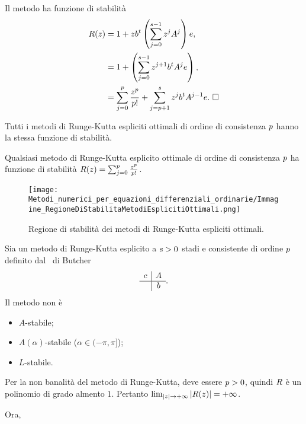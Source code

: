 \par Il metodo ha funzione di stabilit\`a
\begin{align*}
	R(z) &= 1 + z {b}^t \left ( \sum_{j = 0}^{s - 1} z^jA^j \right ) e,\\
	&= 1 + \left ( \sum_{j = 0}^{s - 1} z^{j + 1} {b}^t A^j e \right ),\\
	&= \sum_{j = 0}^p \frac{z^p}{p !} + \sum_{j = p + 1}^s z^j {b}^t A^{j - 1} e.\text{ $\square$}
\end{align*}
\begin{Corollary}
	Tutti i metodi di Runge-Kutta espliciti ottimali di ordine di consistenza $p$ hanno la stessa funzione di stabilit\`a.
\end{Corollary}
\Proof Qualsiasi metodo di Runge-Kutta esplicito ottimale di ordine di consistenza $p$ ha funzione di stabilit\`a $R(z) = \sum_{j = 0}^p \frac{z^p}{p !}$. \EndProof
\begin{figure}
	\texttt{[image: Metodi\_numerici\_per\_equazioni\_differenziali\_ordinarie/Immagine\_RegioneDiStabilitaMetodiEsplicitiOttimali.png]}
	\centering
	\caption{Regione di stabilit\`a dei metodi di Runge-Kutta espliciti ottimali.}
\end{figure}
\begin{Corollary}
	Sia un metodo di Runge-Kutta esplicito a $s > 0$ stadi e consistente di ordine $p$ definito dal \tableau\ di Butcher
	\[
	\begin{array}{c|c}
		c	&	A\\
		\hline
			&	b
	\end{array}.
	\]
	Il metodo non \`e
	\begin{itemize}
		\item $A$-stabile;
		\item $A(\alpha)$-stabile ($\alpha \in (-\pi,\pi]$);
		\item $L$-stabile.
	\end{itemize}
\end{Corollary}
\Proof Per la non banalit\`a del metodo di Runge-Kutta, deve essere $p > 0$, quindi $R$ \`e un polinomio di grado almento $1$. Pertanto $\lim_{\left \lvert z \right \rvert \rightarrow + \infty} \left \lvert R(z) \right \rvert = + \infty$.
\par Ora,
